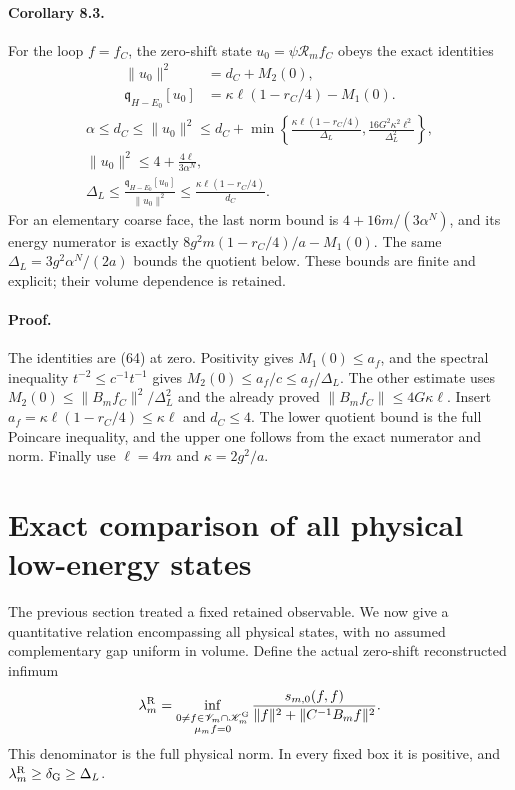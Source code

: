 \documentclass[11pt]{article}
\newcommand{\KK}{\mathscr K}
\newcommand{\VV}{\mathscr V}
\begin{document}
\paragraph{Corollary 8.3.}
For the loop $f=f_C$, the zero-shift state
$u_0=\psi\mathcal R_m f_C$ obeys the exact identities
\begin{align}
 \|u_0\|^2&=d_C+M_2(0),\nonumber\\
 \mathfrak q_{H-E_0}[u_0]&=\kappa\ell(1-r_C/4)-M_1(0).
 \label{eq:zeroloopactual}
\end{align}
\begin{gather}
 \alpha\leq d_C\leq\|u_0\|^2
 \leq d_C+\min\left\{
       \frac{\kappa\ell(1-r_C/4)}{\Delta_L},
       \frac{16G^2\kappa^2\ell^2}{\Delta_L^2}\right\},
 \label{eq:zeroloopnorm}\\
 \|u_0\|^2\leq4+\frac{4\ell}{3\alpha^N},\nonumber\\
 \Delta_L\leq
 \frac{\mathfrak q_{H-E_0}[u_0]}{\|u_0\|^2}
 \leq\frac{\kappa\ell(1-r_C/4)}{d_C}.\label{eq:zeroloopenergy}
\end{gather}
For an elementary coarse face, the last norm bound is
$4+16m/(3\alpha^N)$, and its energy numerator is exactly
$8g^2m(1-r_C/4)/a-M_1(0)$. The same $\Delta_L=3g^2\alpha^N/(2a)$
bounds the quotient below. These bounds are finite and explicit;
their volume dependence is retained.

\paragraph{Proof.}
The identities are (64) at zero.
Positivity gives $M_1(0)\leq a_f$, and the spectral inequality
$t^{-2}\leq c^{-1}t^{-1}$ gives
$M_2(0)\leq a_f/c\leq a_f/\Delta_L$.
The other estimate uses $M_2(0)\leq\|B_mf_C\|^2/\Delta_L^2$
and the already proved $\|B_mf_C\|\leq4G\kappa\ell$.
Insert $a_f=\kappa\ell(1-r_C/4)\leq\kappa\ell$ and
$d_C\leq4$. The lower quotient bound is the full Poincare inequality,
and the upper one follows from the exact numerator and norm.
Finally use $\ell=4m$ and $\kappa=2g^2/a$.



\section{Exact comparison of all physical low-energy states}
\label{sec:allsoft}

The previous section treated a fixed retained observable. We now give
a quantitative relation encompassing all physical states, with no
assumed complementary gap uniform in volume. Define the actual
zero-shift reconstructed infimum
\begin{equation}\label{eq:reconstructedgap}
 \lambda_m^{\rm R}
 =\inf_{\substack{0\ne f\in\VV_m\cap\KK_m^{\rm G}\\\mu_m f=0}}
 \frac{s_{m,0}(f,f)}
      {\|f\|^2+\|C^{-1}B_mf\|^2}.
\end{equation}
This denominator is the full physical norm. In every fixed box it is
positive, and $\lambda_m^{\rm R}\geq\delta_{\rm G}\geq\Delta_L$.
\end{document}
